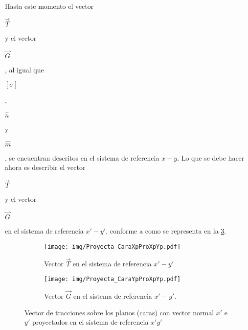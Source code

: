 \documentclass[12pt,letterpaper, twoside, openany]{article}
\begin{document}
%
Hasta este momento el vector \begin{large} $\overset{\rightarrow}{T}$\end{large} y  el vector \begin{large} $\overset{\rightarrow}{G}$\end{large}, al igual que  \begin{large} $\left[ \sigma \right]$\end{large}, \begin{large} $\hat{n}$\end{large} y \begin{large} $\hat{m}$\end{large}, se encuentran descritos en el sistema de referencia $x-y$. 
%
%
Lo que se debe hacer ahora es describir el vector \begin{large} $\overset{\rightarrow}{T}$\end{large} y el vector  \begin{large} $\overset{\rightarrow}{G}$\end{large} en el sistema de referencia $x'-y'$, conforme a como se representa en la \cref{fig:proycaraxpyp}.  

\begin{figure}[H]
	\centering
	\begin{subfigure}[l]{0.45\textwidth}
		\texttt{[image: img/Proyecta\_CaraXpProXpYp.pdf]}
		\caption{\small{Vector $\overset{\rightarrow}{T}$ en el sistema de referencia $x'-y'$}}
		\label{fig:TPxpyp}
	\end{subfigure}
	\hspace{0.5 cm}
	\begin{subfigure}[r]{0.45\textwidth}
		\texttt{[image: img/Proyecta\_CaraYpProXpYp.pdf]}
		\caption{\small{Vector $\overset{\rightarrow}{G}$ en el sistema de referencia $x'-y'$.}}
		\label{fig:GPxpyp}
	\end{subfigure}
	\hspace{.5 cm}
	\caption{Vector de tracciones sobre los planos (caras) con vector normal $x'$ e $y'$ proyectados en el sistema de referencia $x'y'$}
	\label{fig:proycaraxpyp}
\end{figure}
\end{document}
